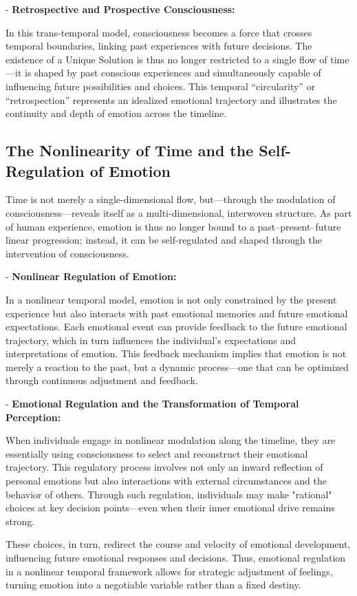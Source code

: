 \documentclass{article}
\begin{document}
- \textbf{Retrospective and Prospective Consciousness:}

In this trans-temporal model, consciousness becomes a force that crosses temporal boundaries, linking past experiences with future decisions. The existence of a Unique Solution is thus no longer restricted to a single flow of time—it is shaped by past conscious experiences and simultaneously capable of influencing future possibilities and choices. This temporal “circularity” or “retrospection” represents an idealized emotional trajectory and illustrates the continuity and depth of emotion across the timeline.

\subsection{The Nonlinearity of Time and the Self-Regulation of Emotion}

Time is not merely a single-dimensional flow, but—through the modulation of consciousness—reveals itself as a multi-dimensional, interwoven structure. As part of human experience, emotion is thus no longer bound to a past–present–future linear progression; instead, it can be self-regulated and shaped through the intervention of consciousness.

- \textbf{Nonlinear Regulation of Emotion:}

In a nonlinear temporal model, emotion is not only constrained by the present experience but also interacts with past emotional memories and future emotional expectations. Each emotional event can provide feedback to the future emotional trajectory, which in turn influences the individual’s expectations and interpretations of emotion. This feedback mechanism implies that emotion is not merely a reaction to the past, but a dynamic process—one that can be optimized through continuous adjustment and feedback.

- \textbf{Emotional Regulation and the Transformation of Temporal Perception:}

When individuals engage in nonlinear modulation along the timeline, they are essentially using consciousness to select and reconstruct their emotional trajectory. This regulatory process involves not only an inward reflection of personal emotions but also interactions with external circumstances and the behavior of others. Through such regulation, individuals may make "rational" choices at key decision points—even when their inner emotional drive remains strong. 

These choices, in turn, redirect the course and velocity of emotional development, influencing future emotional responses and decisions. Thus, emotional regulation in a nonlinear temporal framework allows for strategic adjustment of feelings, turning emotion into a negotiable variable rather than a fixed destiny.
\end{document}
